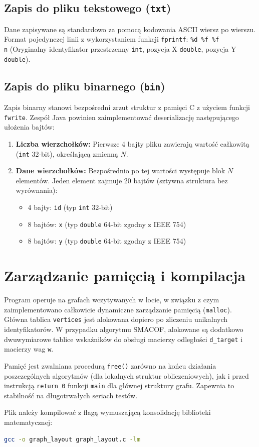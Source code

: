 \documentclass[12pt,a4paper]{article}
\begin{document}
\subsection{Zapis do pliku tekstowego (\texttt{txt})}
Dane zapisywane są standardowo za pomocą kodowania ASCII wiersz po wierszu. 
Format pojedynczej linii z wykorzystaniem funkcji \texttt{fprintf}: \texttt{\%d \%f \%f\\n} (Oryginalny identyfikator przestrzenny \texttt{int}, pozycja X \texttt{double}, pozycja Y \texttt{double}). 

\subsection{Zapis do pliku binarnego (\texttt{bin})}
Zapis binarny stanowi bezpośredni zrzut struktur z pamięci C z użyciem funkcji \texttt{fwrite}. Zespół Java powinien zaimplementować deserializację następującego ułożenia bajtów:
\begin{enumerate}
    \item \textbf{Liczba wierzchołków:} Pierwsze 4 bajty pliku zawierają wartość całkowitą (\texttt{int} 32-bit), określającą zmienną $N$.
    \item \textbf{Dane wierzchołków:} Bezpośrednio po tej wartości występuje blok $N$ elementów. Jeden element zajmuje 20 bajtów (sztywna struktura bez wyrównania):
    \begin{itemize}
        \item 4 bajty: \texttt{id} (typ \texttt{int} 32-bit)
        \item 8 bajtów: \texttt{x} (typ \texttt{double} 64-bit zgodny z IEEE 754)
        \item 8 bajtów: \texttt{y} (typ \texttt{double} 64-bit zgodny z IEEE 754)
    \end{itemize}
\end{enumerate}

\section{Zarządzanie pamięcią i kompilacja}
Program operuje na grafach wczytywanych w locie, w związku z czym zaimplementowano całkowicie dynamiczne zarządzanie pamięcią (\texttt{malloc}). Główna tablica \texttt{vertices} jest alokowana dopiero po zliczeniu unikalnych identyfikatorów. W przypadku algorytmu SMACOF, alokowane są dodatkowo dwuwymiarowe tablice wskaźników do obsługi macierzy odległości \texttt{d\_target} i macierzy wag \texttt{w}.

Pamięć jest zwalniana procedurą \texttt{free()} zarówno na końcu działania poszczególnych algorytmów (dla lokalnych struktur obliczeniowych), jak i przed instrukcją \texttt{return 0} funkcji \texttt{main} dla głównej struktury grafu. Zapewnia to stabilność na długotrwałych seriach testów. 

Plik należy kompilować z flagą wymuszającą konsolidację biblioteki matematycznej:
\begin{lstlisting}[language=bash]
gcc -o graph_layout graph_layout.c -lm
\end{lstlisting}
\end{document}
